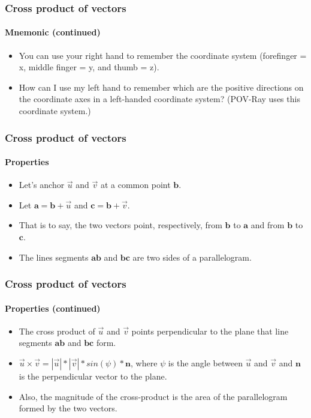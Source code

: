 \documentclass[xcolor=dvipsnames]{beamer}
\begin{document}
\begin{frame}
\frametitle{Cross product of vectors}
\framesubtitle{Mnemonic (continued)}

  \begin{itemize}
    \item You can use your right hand to remember the coordinate system (forefinger = x, middle finger = y, and thumb = z).
    \item How can I use my left hand to remember which are the
      positive directions on the coordinate axes in a left-handed
      coordinate system? (POV-Ray uses this coordinate system.)
    \end{itemize}

  \end{frame}

\begin{frame}
\frametitle{Cross product of vectors}
\framesubtitle{Properties}

  \begin{itemize}
    \item Let's anchor $\vec{u}$ and $\vec{v}$ at a common
      point $\mathbf{b}$.
    \item Let $\mathbf{a} = \mathbf{b} + \vec{u}$ and
      $\mathbf{c} = \mathbf{b} + \vec{v}$.
    \item That is to say, the two vectors point, respectively,
      from $\mathbf{b}$ to $\mathbf{a}$ and from $\mathbf{b}$
      to $\mathbf{c}$.
    \item The lines segments $\mathbf{ab}$ and $\mathbf{bc}$ are
      two sides of a parallelogram.
    \end{itemize}

  \end{frame}

\begin{frame}
\frametitle{Cross product of vectors}
\framesubtitle{Properties (continued)}

  \begin{itemize}
    \item The cross product of $\vec{u}$ and $\vec{v}$ points perpendicular to the plane that line segments $\mathbf{ab}$ and $\mathbf{bc}$ form.
    \item $\vec{u} \times \vec{v} = |\vec{u}| * |\vec{v}| * sin(\psi) * \mathbf{n}$, where $\psi$ is the angle between $\vec{u}$ and $\vec{v}$ and $\mathbf{n}$ is the perpendicular vector to the plane.
    \item Also, the magnitude of the cross-product is the area of the parallelogram formed by the two vectors.
    \end{itemize}

  \end{frame}
\end{document}
